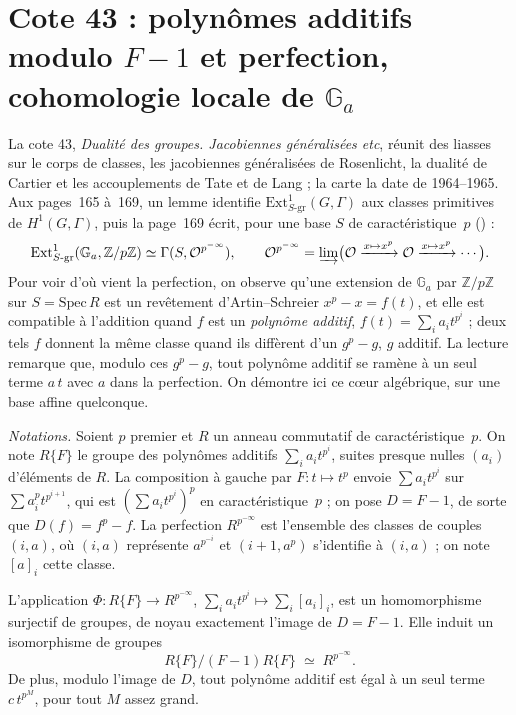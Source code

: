 \section[Cote 43 : polynômes additifs modulo $F - 1$ et perfection, cohomologie locale de $\mathbb G_a$]{Cote 43 : polynômes additifs modulo $F - 1$ et perfection, cohomologie locale de $\mathbb G_a$\protect{}}\label{sec:43}

La cote 43, \emph{Dualité des groupes. Jacobiennes généralisées etc}, réunit des liasses sur le corps de classes, les jacobiennes généralisées de Rosenlicht, la dualité de Cartier et les accouplements de Tate et de Lang ; la carte la date de 1964--1965. Aux pages~165 à~169, un lemme identifie $\mathrm{Ext}^1_{S\text{-gr}}(G, \Gamma)$ aux classes primitives de $H^1(G, \Gamma)$, puis la page~169 écrit, pour une base $S$ de caractéristique~$p$ () :
\[
\mathrm{Ext}^1_{S\text{-gr}}(\mathbb G_a, \mathbb Z/p\mathbb Z) \simeq \Gamma(S, \mathcal O^{p^{-\infty}}), \qquad \mathcal O^{p^{-\infty}} = \varinjlim\bigl(\mathcal O \xrightarrow{x \mapsto x^p} \mathcal O \xrightarrow{x \mapsto x^p} \cdots\bigr).
\]
Pour voir d'où vient la perfection, on observe qu'une extension de $\mathbb G_a$ par $\mathbb Z/p\mathbb Z$ sur $S = \mathrm{Spec}\,R$ est un revêtement d'Artin--Schreier $x^p - x = f(t)$, et elle est compatible à l'addition quand $f$ est un \emph{polynôme additif}, $f(t) = \sum_i a_i t^{p^i}$ ; deux tels $f$ donnent la même classe quand ils diffèrent d'un $g^p - g$, $g$ additif. La lecture remarque que, modulo ces $g^p - g$, tout polynôme additif se ramène à un seul terme $a\,t$ avec $a$ dans la perfection. On démontre ici ce cœur algébrique, sur une base affine quelconque.

\noindent\emph{Notations.} Soient $p$ premier et $R$ un anneau commutatif de caractéristique~$p$. On note $R\{F\}$ le groupe des polynômes additifs $\sum_i a_i t^{p^i}$, suites presque nulles $(a_i)$ d'éléments de $R$. La composition à gauche par $F : t \mapsto t^p$ envoie $\sum a_i t^{p^i}$ sur $\sum a_i^p t^{p^{i+1}}$, qui est $(\sum a_i t^{p^i})^p$ en caractéristique~$p$ ; on pose $D = F - 1$, de sorte que $D(f) = f^p - f$. La perfection $R^{p^{-\infty}}$ est l'ensemble des classes de couples $(i, a)$, où $(i, a)$ représente $a^{p^{-i}}$ et $(i + 1, a^p)$ s'identifie à $(i, a)$ ; on note $[a]_i$ cette classe.

\begin{encadre}
\begin{theoreme*}
L'application $\Phi : R\{F\} \to R^{p^{-\infty}}$, $\sum_i a_i t^{p^i} \mapsto \sum_i [a_i]_i$, est un homomorphisme surjectif de groupes, de noyau exactement l'image de $D = F - 1$. Elle induit un isomorphisme de groupes
\[
R\{F\}/(F - 1)R\{F\} \;\simeq\; R^{p^{-\infty}}.
\]
De plus, modulo l'image de $D$, tout polynôme additif est égal à un seul terme $c\,t^{p^M}$, pour tout $M$ assez grand.
\end{theoreme*}
\end{encadre}


